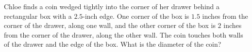 Chloe finds a coin wedged tightly into the corner of her drawer behind a rectangular box with a $2.5$-inch edge. One corner of the box is $1.5$ inches from the corner of the drawer, along one wall, and the other corner of the box is $2$ inches from the corner of the drawer, along the other wall. The coin touches both walls of the drawer and the edge of the box. What is the diameter of the coin?
